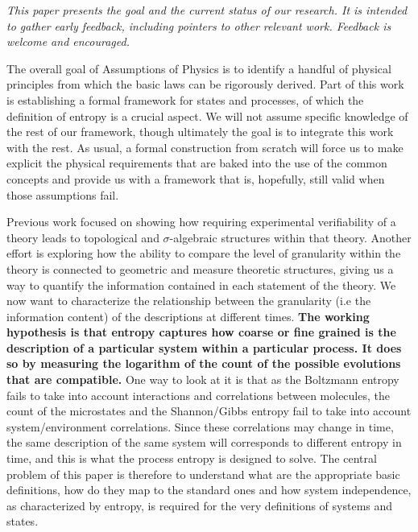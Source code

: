 \documentclass[10pt, onecolumn, longbibliography, nofootinbib]{revtex4-2}
\begin{document}
\emph{This paper presents the goal and the current status of our research. It is intended to gather early feedback, including pointers to other relevant work. Feedback is welcome and encouraged.}

The overall goal of Assumptions of Physics is to identify a handful of physical principles from which the basic laws can be rigorously derived. Part of this work is establishing a formal framework for states and processes, of which the definition of entropy is a crucial aspect. We will not assume specific knowledge of the rest of our framework\cite{aop-book,aop-overview-verifiability}, though ultimately the goal is to integrate this work with the rest. As usual, a formal construction from scratch will force us to make explicit the physical requirements that are baked into the use of the common concepts and provide us with a framework that is, hopefully, still valid when those assumptions fail.

Previous work focused on showing how requiring experimental verifiability of a theory leads to topological and $\sigma$-algebraic structures within that theory. Another effort is exploring how the ability to compare the level of granularity within the theory is connected to geometric and measure theoretic structures, giving us a way to quantify the information contained in each statement of the theory. We now want to characterize the relationship between the granularity  (i.e the information content) of the descriptions at different times. \textbf{The working hypothesis is that entropy captures how coarse or fine grained is the description of a particular system within a particular process. It does so by measuring the logarithm of the count of the possible evolutions that are compatible.} One way to look at it is that as the Boltzmann entropy fails to take into account interactions and correlations between molecules, the count of the microstates and the Shannon/Gibbs entropy fail to take into account system/environment correlations. Since these correlations may change in time, the same description of the same system will corresponds to different entropy in time, and this is what the process entropy is designed to solve. The central problem of this paper is therefore to understand what are the appropriate basic definitions, how do they map to the standard ones and how system independence, as characterized by entropy, is required for the very definitions of systems and states.
\end{document}
